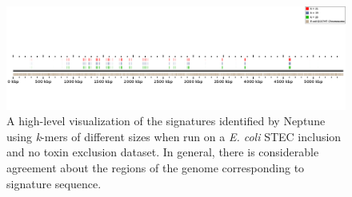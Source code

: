 \documentclass[a4paper,10pt]{article}
\begin{document}
\begin{figure}
\centering
\includegraphics[width=1.0\textwidth]{ecoli_kmers_crop.png}
\caption{A high-level visualization of the signatures identified by Neptune using \textit{k}-mers of different sizes when run on a \textit{E. coli} STEC inclusion and no toxin exclusion dataset. In general, there is considerable agreement about the regions of the genome corresponding to signature sequence.}
\label{figure:ecoli_kmers}
\end{figure}
\end{document}
